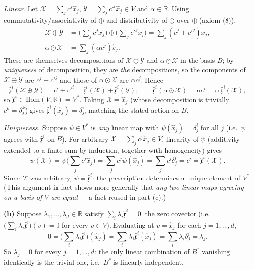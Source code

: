 \documentclass[11pt]{article}
\newcommand{\dual}{V^{*}}
\begin{document}
\emph{Linear.} Let $\mathcal X=\sum_jc^j\hat x_j$, $\mathcal Y=\sum_jc'^j\hat x_j\in V$ and $\alpha\in\mathbb R$. Using commutativity/associativity of $\oplus$ and distributivity of $\odot$ over $\oplus$ (axiom (8)),
\begin{align*}
\mathcal X\oplus\mathcal Y &=\Big(\sum_jc^j\hat x_j\Big)\oplus\Big(\sum_jc'^j\hat x_j\Big) =\sum_j(c^j+c'^j)\hat x_j, \\
\alpha\odot\mathcal X &=\sum_j(\alpha c^j)\hat x_j.
\end{align*}
These are themselves decompositions of $\mathcal X\oplus\mathcal Y$ and $\alpha\odot\mathcal X$ in the basis $B$; by \emph{uniqueness} of decomposition, they are \emph{the} decompositions, so the components of $\mathcal X\oplus\mathcal Y$ are $c^j+c'^j$ and those of $\alpha\odot\mathcal X$ are $\alpha c^j$. Hence
\[
\hat{\mathfrak x}^i(\mathcal X\oplus\mathcal Y)=c^i+c'^i=\hat{\mathfrak x}^i(\mathcal X)+\hat{\mathfrak x}^i(\mathcal Y), \qquad \hat{\mathfrak x}^i(\alpha\odot\mathcal X)=\alpha c^i=\alpha\,\hat{\mathfrak x}^i(\mathcal X),
\]
so $\hat{\mathfrak x}^i\in\mathrm{Hom}(V,\mathbb R)=\dual$. Taking $\mathcal X=\hat x_j$ (whose decomposition is trivially $c^k=\delta^k_j$) gives $\hat{\mathfrak x}^i(\hat x_j)=\delta^i_j$, matching the stated action on $B$.

\emph{Uniqueness.} Suppose $\psi\in\dual$ is \emph{any} linear map with $\psi(\hat x_j)=\delta^i_j$ for all $j$ (i.e.\ $\psi$ agrees with $\hat{\mathfrak x}^i$ on $B$). For arbitrary $\mathcal X=\sum_jc^j\hat x_j\in V$, linearity of $\psi$ (additivity extended to a finite sum by induction, together with homogeneity) gives
\[
\psi(\mathcal X)=\psi\Big(\sum_jc^j\hat x_j\Big)=\sum_jc^j\psi(\hat x_j)=\sum_jc^j\delta^i_j=c^i=\hat{\mathfrak x}^i(\mathcal X).
\]
Since $\mathcal X$ was arbitrary, $\psi=\hat{\mathfrak x}^i$: the prescription determines a unique element of $\dual$. (This argument in fact shows more generally that \emph{any two linear maps agreeing on a basis of $V$ are equal} --- a fact reused in part (c).)

\textbf{(b)} Suppose $\lambda_1,\dots,\lambda_d\in\mathbb R$ satisfy $\sum_i\lambda_i\hat{\mathfrak x}^i=0$, the zero covector (i.e.\ $\big(\sum_i\lambda_i\hat{\mathfrak x}^i\big)(v)=0$ for every $v\in V$). Evaluating at $v=\hat x_j$ for each $j=1,\dots,d$,
\[
0=\Big(\sum_i\lambda_i\hat{\mathfrak x}^i\Big)(\hat x_j)=\sum_i\lambda_i\hat{\mathfrak x}^i(\hat x_j)=\sum_i\lambda_i\delta^i_j=\lambda_j.
\]
So $\lambda_j=0$ for every $j=1,\dots,d$: the only linear combination of $B^*$ vanishing identically is the trivial one, i.e.\ $B^*$ is linearly independent.
\end{document}
